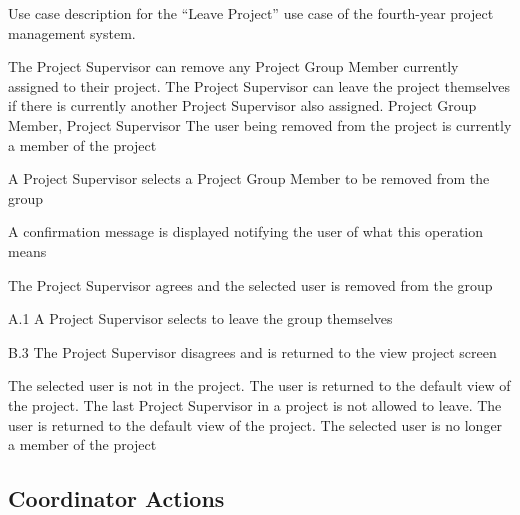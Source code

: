 \begin{table}
  \centering
  \caption{Use case description for the ``Leave Project'' use case of the fourth-year project management system.}
  \label{tbl:use-case-leave-project}

  \begin{usecase}
    The Project Supervisor can remove any Project Group Member currently assigned to their project. The Project Supervisor can leave the project themselves if there is currently another Project Supervisor also assigned.
    Project Group Member, Project Supervisor
    The user being removed from the project is currently a member of the project
    \ucnormal
    \begin{ucenum}
      \item A Project Supervisor selects a Project Group Member to be removed from the group
      \item A confirmation message is displayed notifying the user of what this operation means
      \item The Project Supervisor agrees and the selected user is removed from the group
    \end{ucenum}
    \begin{ucenum*}
      \item [A.1] A Project Supervisor selects to leave the group themselves
    \end{ucenum*}
    \begin{ucenum}
      \item [B.3] The Project Supervisor disagrees and is returned to the view project screen
    \end{ucenum}
    The selected user is not in the project. The user is returned to the default view of the project.
    The last Project Supervisor in a project is not allowed to leave. The user is returned to the default view of the project.
    The selected user is no longer a member of the project
  \end{usecase}
\end{table}


\FloatBarrier

\subsection{Coordinator Actions}
\label{sec:coordinator-actions}

